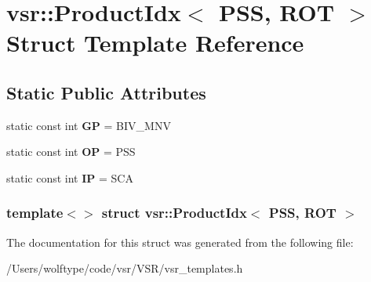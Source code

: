 \hypertarget{structvsr_1_1_product_idx_3_01_p_s_s_00_01_r_o_t_01_4}{\section{vsr\-:\-:Product\-Idx$<$ P\-S\-S, R\-O\-T $>$ Struct Template Reference}
\label{structvsr_1_1_product_idx_3_01_p_s_s_00_01_r_o_t_01_4}
}
\subsection*{Static Public Attributes}
\begin{DoxyCompactItemize}
\item 
\hypertarget{structvsr_1_1_product_idx_3_01_p_s_s_00_01_r_o_t_01_4_aacb3b21dd3f95735a2eab96f0f550791}{static const int {\bfseries G\-P} = B\-I\-V\-\_\-\-M\-N\-V}\label{structvsr_1_1_product_idx_3_01_p_s_s_00_01_r_o_t_01_4_aacb3b21dd3f95735a2eab96f0f550791}

\item 
\hypertarget{structvsr_1_1_product_idx_3_01_p_s_s_00_01_r_o_t_01_4_ab9f099659f0c22fdf0f2e920e8d224b3}{static const int {\bfseries O\-P} = P\-S\-S}\label{structvsr_1_1_product_idx_3_01_p_s_s_00_01_r_o_t_01_4_ab9f099659f0c22fdf0f2e920e8d224b3}

\item 
\hypertarget{structvsr_1_1_product_idx_3_01_p_s_s_00_01_r_o_t_01_4_a17e8939c6c2c4c74418c3a64c5265f00}{static const int {\bfseries I\-P} = S\-C\-A}\label{structvsr_1_1_product_idx_3_01_p_s_s_00_01_r_o_t_01_4_a17e8939c6c2c4c74418c3a64c5265f00}

\end{DoxyCompactItemize}
\subsubsection*{template$<$$>$ struct vsr\-::\-Product\-Idx$<$ P\-S\-S, R\-O\-T $>$}



The documentation for this struct was generated from the following file\-:\begin{DoxyCompactItemize}
\item 
/\-Users/wolftype/code/vsr/\-V\-S\-R/vsr\-\_\-templates.\-h\end{DoxyCompactItemize}

